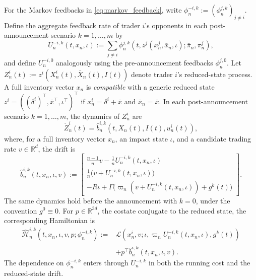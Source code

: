 \documentclass[12pt]{article}
\numberwithin{equation}{section}
\theoremstyle{definition}
\begin{document}
For the Markov feedbacks in \eqref{eq:markov_feedback}, write
\(\phi_n^{-i,k}:=(\phi_n^{j,k})_{j\ne i}\). Define the aggregate feedback rate of trader
\(i\)'s opponents in each post-announcement scenario \(k=1,\ldots,m\) by
\[
U_n^{-i,k}(t,x_n,\iota)
:=\sum_{j\ne i}\phi_n^{j,k}
\left(t,z^j(x_n^j,\bar x_n,\iota);\bar\pi_n,\pi_n^j\right),
\]
and define \(U_n^{-i,0}\) analogously using the pre-announcement feedbacks
\(\phi_n^{j,0}\).
Let \(Z_n^i(t):=z^i(X_n^i(t),\bar X_n(t),I(t))\) denote trader \(i\)'s
reduced-state process. A full inventory vector \(x_n\) is \emph{compatible}
with a generic reduced state
\(z^i=((\delta^i)^\top,\bar x^\top,\iota^\top)^\top\) if
\(x_n^i=\delta^i+\bar x\) and \(\bar x_n=\bar x\). In each post-announcement
scenario \(k=1,\ldots,m\), the dynamics of \(Z_n^i\) are
\[
\dot Z_n^i(t)
=\widehat b_n^{i,k}\left(t,X_n(t),I(t),u_n^i(t)\right),
\]
where, for a full inventory vector \(x_n\), an impact state \(\iota\), and a
candidate trading rate \(v\in\mathbb R^d\), the drift is
\[
\widehat b_n^{i,k}(t,x_n,\iota,v)
:=\begin{bmatrix}
\frac{n-1}{n}v-\frac{1}{n}U_n^{-i,k}(t,x_n,\iota)\\[2pt]
\frac{1}{n}\bigl(v+U_n^{-i,k}(t,x_n,\iota)\bigr)\\[2pt]
-R\iota+\Gamma\bigl(
\varpi_n(v+U_n^{-i,k}(t,x_n,\iota))+g^k(t)
\bigr)
\end{bmatrix}.
\]
The same dynamics hold before the announcement with \(k=0\), under the
convention \(g^0\equiv0\).
For \(p\in\mathbb R^{3d}\), the costate conjugate to the reduced state, the
corresponding Hamiltonian is
\begin{equation}\label{eq:stitched_hamiltonian}
\begin{aligned}
\widehat{\mathscr H}_n^{i,k}(t,x_n,\iota,v,p;\phi_n^{-i,k})
:={}&
\mathcal L\left(
x_n^i,v;\iota,
\varpi_nU_n^{-i,k}(t,x_n,\iota),
g^k(t)
\right)
\\
&+p^\top\widehat b_n^{i,k}(t,x_n,\iota,v).
\end{aligned}
\end{equation}
The dependence on \(\phi_n^{-i,k}\) enters through \(U_n^{-i,k}\) in both
the running cost and the reduced-state drift.
\end{document}
